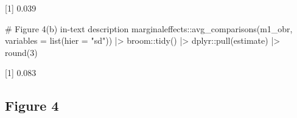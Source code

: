 \documentclass[
  12,
  letterpaper,
  DIV=11,
  numbers=noendperiod]{scrartcl}
\newenvironment{Shaded}{\begin{snugshade}}{\end{snugshade}}
\newcommand{\AttributeTok}[1]{\textcolor[rgb]{0.40,0.45,0.13}{#1}}
\newcommand{\CommentTok}[1]{\textcolor[rgb]{0.37,0.37,0.37}{#1}}
\newcommand{\DecValTok}[1]{\textcolor[rgb]{0.68,0.00,0.00}{#1}}
\newcommand{\FunctionTok}[1]{\textcolor[rgb]{0.28,0.35,0.67}{#1}}
\newcommand{\NormalTok}[1]{\textcolor[rgb]{0.00,0.23,0.31}{#1}}
\newcommand{\SpecialCharTok}[1]{\textcolor[rgb]{0.37,0.37,0.37}{#1}}
\newcommand{\StringTok}[1]{\textcolor[rgb]{0.13,0.47,0.30}{#1}}
\begin{document}
\begin{Shaded}
\begin{Highlighting}[numbers=left,,]
\NormalTok{[1] 0.039}
\end{Highlighting}
\end{Shaded}

\begin{Shaded}
\begin{Highlighting}[numbers=left,,]
\CommentTok{\# Figure 4(b) in{-}text description}
\NormalTok{marginaleffects}\SpecialCharTok{::}\FunctionTok{avg\_comparisons}\NormalTok{(m1\_obr, }\AttributeTok{variables =} \FunctionTok{list}\NormalTok{(}\AttributeTok{hier =} \StringTok{"sd"}\NormalTok{)) }\SpecialCharTok{|\textgreater{}}\NormalTok{ broom}\SpecialCharTok{::}\FunctionTok{tidy}\NormalTok{() }\SpecialCharTok{|\textgreater{}}\NormalTok{ dplyr}\SpecialCharTok{::}\FunctionTok{pull}\NormalTok{(estimate) }\SpecialCharTok{|\textgreater{}} \FunctionTok{round}\NormalTok{(}\DecValTok{3}\NormalTok{)}
\end{Highlighting}
\end{Shaded}

\begin{Shaded}
\begin{Highlighting}[numbers=left,,]
\NormalTok{[1] 0.083}
\end{Highlighting}
\end{Shaded}

\newpage

\subsection{Figure 4}\label{figure-4}
\end{document}
